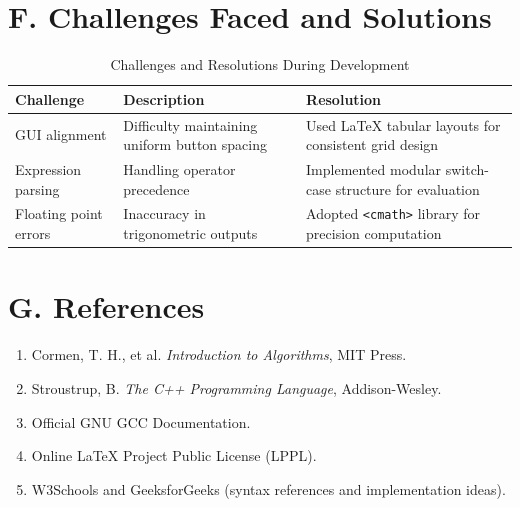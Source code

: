 \documentclass[a4paper,12pt,oneside]{report}
\numberwithin{equation}{chapter}
\numberwithin{figure}{chapter}
\numberwithin{table}{chapter}
\begin{document}
\section*{F. Challenges Faced and Solutions}

\begin{table}[H]
\centering
\begin{tabular}{|p{3cm}|p{5cm}|p{5cm}|}
\hline
\textbf{Challenge} & \textbf{Description} & \textbf{Resolution} \\ \hline
GUI alignment & Difficulty maintaining uniform button spacing & Used \LaTeX{} tabular layouts for consistent grid design \\ \hline
Expression parsing & Handling operator precedence & Implemented modular switch-case structure for evaluation \\ \hline
Floating point errors & Inaccuracy in trigonometric outputs & Adopted \texttt{<cmath>} library for precision computation \\ \hline
\end{tabular}
\caption{Challenges and Resolutions During Development}
\end{table}

\section*{G. References}
\begin{enumerate}
    \item Cormen, T. H., et al. \textit{Introduction to Algorithms}, MIT Press.
    \item Stroustrup, B. \textit{The C++ Programming Language}, Addison-Wesley.
    \item Official GNU GCC Documentation.
    \item Online \LaTeX{} Project Public License (LPPL).
    \item W3Schools and GeeksforGeeks (syntax references and implementation ideas).
\end{enumerate}
\end{document}
